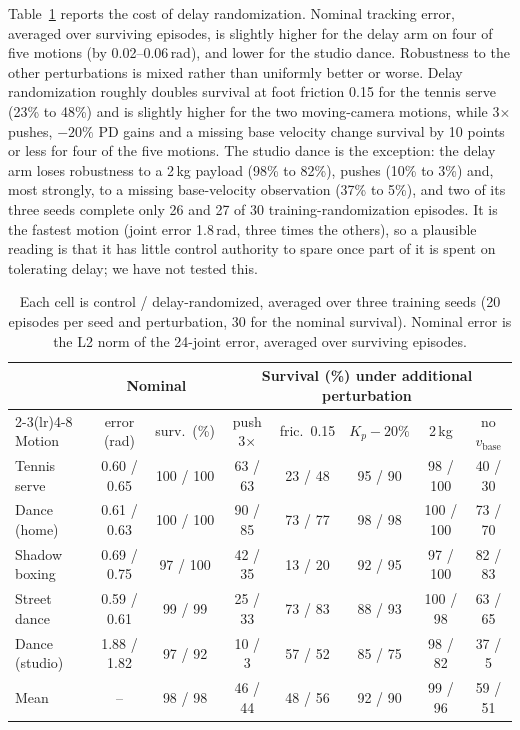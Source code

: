 \documentclass{l4dc2026}
\begin{document}
Table~\ref{tab:cost} reports the cost of delay randomization.
Nominal tracking error, averaged over surviving episodes, is slightly higher for the delay arm on four of five motions (by 0.02--0.06\,rad), and lower for the studio dance.
Robustness to the other perturbations is mixed rather than uniformly better or worse.
Delay randomization roughly doubles survival at foot friction 0.15 for the tennis serve (23\% to 48\%) and is slightly higher for the two moving-camera motions, while 3$\times$ pushes, $-20\%$ PD gains and a missing base velocity change survival by 10 points or less for four of the five motions.
The studio dance is the exception: the delay arm loses robustness to a 2\,kg payload (98\% to 82\%), pushes (10\% to 3\%) and, most strongly, to a missing base-velocity observation (37\% to 5\%), and two of its three seeds complete only 26 and 27 of 30 training-randomization episodes.
It is the fastest motion (joint error 1.8\,rad, three times the others), so a plausible reading is that it has little control authority to spare once part of it is spent on tolerating delay; we have not tested this.

\begin{table}[t]
\centering\footnotesize
\begin{tabular}{lccccccc}
\toprule
 & \multicolumn{2}{c}{Nominal} & \multicolumn{5}{c}{Survival (\%) under additional perturbation} \\
\cmidrule(lr){2-3}\cmidrule(lr){4-8}
Motion & error (rad) & surv.\ (\%) & push 3$\times$ & fric.\ 0.15 & $K_p{-}20\%$ & 2\,kg & no $v_\mathrm{base}$ \\
\midrule
Tennis serve & 0.60 / 0.65 & 100 / 100 & 63 / 63 & 23 / 48 & 95 / 90 & 98 / 100 & 40 / 30 \\
Dance (home) & 0.61 / 0.63 & 100 / 100 & 90 / 85 & 73 / 77 & 98 / 98 & 100 / 100 & 73 / 70 \\
Shadow boxing & 0.69 / 0.75 & 97 / 100 & 42 / 35 & 13 / 20 & 92 / 95 & 97 / 100 & 82 / 83 \\
Street dance & 0.59 / 0.61 & 99 / 99 & 25 / 33 & 73 / 83 & 88 / 93 & 100 / 98 & 63 / 65 \\
Dance (studio) & 1.88 / 1.82 & 97 / 92 & 10 / 3 & 57 / 52 & 85 / 75 & 98 / 82 & 37 / 5 \\
\midrule
Mean & -- & 98 / 98 & 46 / 44 & 48 / 56 & 92 / 90 & 99 / 96 & 59 / 51 \\
\bottomrule
\end{tabular}
\caption{Each cell is control / delay-randomized, averaged over three training seeds (20 episodes per seed and perturbation, 30 for the nominal survival). Nominal error is the L2 norm of the 24-joint error, averaged over surviving episodes.}
\label{tab:cost}
\end{table}
\end{document}
